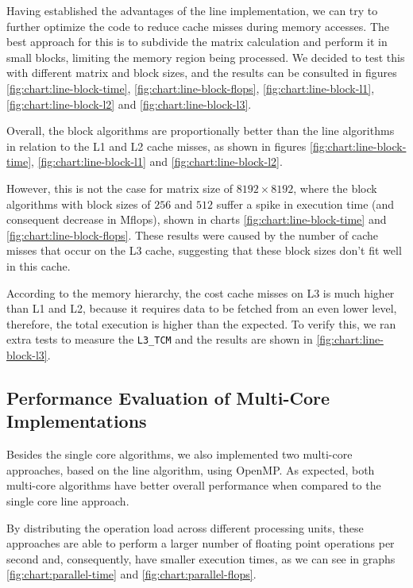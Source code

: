 Having established the advantages of the line implementation, we can try to further optimize the code to reduce cache misses during memory accesses. The best approach for this is to subdivide the matrix calculation and perform it in small blocks, limiting the memory region being processed. We decided to test this with different matrix and block sizes, and the results can be consulted in figures \ref{fig:chart:line-block-time}, \ref{fig:chart:line-block-flops}, \ref{fig:chart:line-block-l1}, \ref{fig:chart:line-block-l2} and \ref{fig:chart:line-block-l3}.

Overall, the block algorithms are proportionally better than the line algorithms in relation to the L1 and L2 cache misses, as shown in figures \ref{fig:chart:line-block-time}, \ref{fig:chart:line-block-l1} and \ref{fig:chart:line-block-l2}.

However, this is not the case for matrix size of $8192 \times 8192$, where the block algorithms with block sizes of $256$ and $512$ suffer a spike in execution time (and consequent decrease in Mflops), shown in charts \ref{fig:chart:line-block-time} and \ref{fig:chart:line-block-flops}. These results were caused by the number of cache misses that occur on the L3 cache, suggesting that these block sizes don't fit well in this cache.

According to the memory hierarchy, the cost cache misses on L3 is much higher than L1 and L2, because it requires data to be fetched from an even lower level, therefore, the total execution is higher than the expected. To verify this, we ran extra tests to measure the \verb#L3_TCM# and the results are shown in \ref{fig:chart:line-block-l3}.

\subsection{Performance Evaluation of Multi-Core Implementations}

Besides the single core algorithms, we also implemented two multi-core approaches, based on the line algorithm, using OpenMP. As expected, both multi-core algorithms have better overall performance when compared to the single core line approach.

By distributing the operation load across different processing units, these approaches are able to perform a larger number of floating point operations per second and, consequently, have smaller execution times, as we can see in graphs \ref{fig:chart:parallel-time} and \ref{fig:chart:parallel-flops}.

